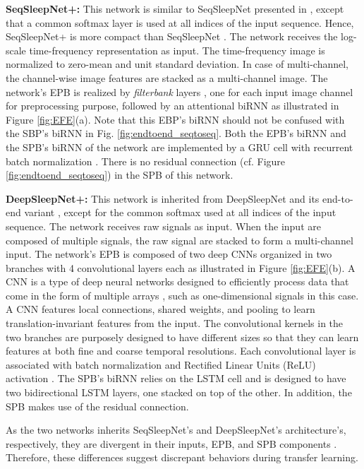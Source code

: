 \documentclass[journal,twoside,web]{ieeecolor}
\begin{document}
{\bf SeqSleepNet+:} This network is similar to SeqSleepNet presented in \cite{Phan2019a}, except that a common softmax layer is used at all indices of the input sequence. Hence, SeqSleepNet+ is more compact than SeqSleepNet \cite{Phan2019a}. The network receives the log-scale time-frequency representation \cite{Phan2019a} as input. The time-frequency image is normalized to zero-mean and unit standard deviation. In case of multi-channel, the channel-wise image features are stacked as a multi-channel image. The network's EPB is realized by \emph{filterbank} layers \cite{phan2018c, Phan2019a}, one for each input image channel for preprocessing purpose, followed by an attentional biRNN as illustrated in Figure \ref{fig:EFE}(a). Note that this EBP's biRNN should not be confused with the SBP's biRNN in Fig. \ref{fig:endtoend_seqtoseq}. Both the EPB's biRNN and the SPB's biRNN of the network are implemented by a GRU cell \cite{Cho2014} with recurrent batch normalization \cite{Cooijmans2016}. There is no residual connection (cf. Figure \ref{fig:endtoend_seqtoseq}) in the SPB of this network.

{\bf DeepSleepNet+:} This network is inherited from DeepSleepNet \cite{Supratak2017} and its end-to-end variant \cite{Phan2019a}, except for the common softmax used at all indices of the input sequence. The network receives raw signals as input. When the input are composed of multiple signals, the raw signal are stacked to form a multi-channel input. The network's EPB is composed of two deep CNNs organized in two branches with 4 convolutional layers each as illustrated in Figure \ref{fig:EFE}(b). A CNN is a type of deep neural networks designed to efficiently process data that come in the form of multiple arrays \cite{LeCun2015}, such as one-dimensional signals in this case. A CNN features local connections, shared weights, and pooling to learn translation-invariant features from the input.  The convolutional kernels in the two branches are purposely designed to have different sizes so that they can learn features at both fine and coarse temporal resolutions. Each convolutional layer is associated with batch normalization \cite{Ioffe2015} and Rectified Linear Units (ReLU) activation \cite{Nair2010}. The SPB's biRNN relies on the LSTM cell  \cite{Hochreiter1997} and is designed to have two bidirectional LSTM layers, one stacked on top of the other. In addition, the SPB makes use of the residual connection.

As the two networks inherits SeqSleepNet's and DeepSleepNet's architecture's, respectively, they are divergent in their inputs, EPB, and SPB components \cite{Phan2019d}. Therefore, these differences suggest discrepant behaviors during transfer learning.
\end{document}
